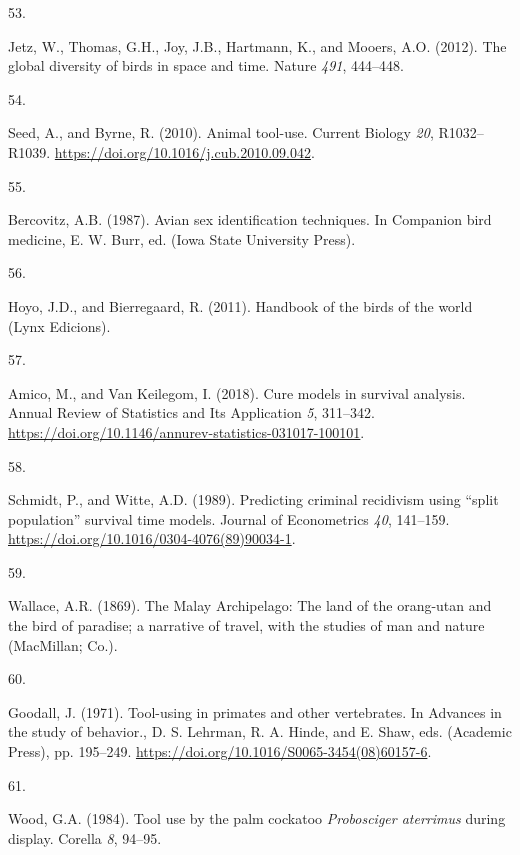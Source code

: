 \documentclass[
  man, donotrepeattitle,floatsintext]{apa6}
\newlength{\cslhangindent}
\newlength{\csllabelwidth}
\newlength{\cslentryspacingunit} %
\newenvironment{CSLReferences}[2] %
 {%
  \setlength{\parindent}{0pt}
  \ifodd #1
  \let\oldpar\par
  \def\par{\hangindent=\cslhangindent\oldpar}
  \fi
  \setlength{\parskip}{#2\cslentryspacingunit}
 }%
 {}
\newcommand{\CSLLeftMargin}[1]{\parbox[t]{\csllabelwidth}{#1}}
\newcommand{\CSLRightInline}[1]{\parbox[t]{\linewidth - \csllabelwidth}{#1}\break}
\begin{document}
\begin{CSLReferences}{0}{0}
\leavevmode{}%
\CSLLeftMargin{53. }%
\CSLRightInline{Jetz, W., Thomas, G.H., Joy, J.B., Hartmann, K., and Mooers, A.O. (2012). The global diversity of birds in space and time. Nature \emph{491}, 444--448.}

\leavevmode{}%
\CSLLeftMargin{54. }%
\CSLRightInline{Seed, A., and Byrne, R. (2010). Animal tool-use. Current Biology \emph{20}, R1032--R1039. \url{https://doi.org/10.1016/j.cub.2010.09.042}.}

\leavevmode{}%
\CSLLeftMargin{55. }%
\CSLRightInline{Bercovitz, A.B. (1987). Avian sex identification techniques. In Companion bird medicine, E. W. Burr, ed. (Iowa State University Press).}

\leavevmode{}%
\CSLLeftMargin{56. }%
\CSLRightInline{Hoyo, J.D., and Bierregaard, R. (2011). Handbook of the birds of the world (Lynx Edicions).}

\leavevmode{}%
\CSLLeftMargin{57. }%
\CSLRightInline{Amico, M., and Van Keilegom, I. (2018). Cure models in survival analysis. Annual Review of Statistics and Its Application \emph{5}, 311--342. \url{https://doi.org/10.1146/annurev-statistics-031017-100101}.}

\leavevmode{}%
\CSLLeftMargin{58. }%
\CSLRightInline{Schmidt, P., and Witte, A.D. (1989). Predicting criminal recidivism using {``split population''} survival time models. Journal of Econometrics \emph{40}, 141--159. \url{https://doi.org/10.1016/0304-4076(89)90034-1}.}

\leavevmode{}%
\CSLLeftMargin{59. }%
\CSLRightInline{Wallace, A.R. (1869). The {M}alay {A}rchipelago: The land of the orang-utan and the bird of paradise; a narrative of travel, with the studies of man and nature (MacMillan; Co.).}

\leavevmode{}%
\CSLLeftMargin{60. }%
\CSLRightInline{Goodall, J. (1971). Tool-using in primates and other vertebrates. In Advances in the study of behavior., D. S. Lehrman, R. A. Hinde, and E. Shaw, eds. (Academic Press), pp. 195--249. \url{https://doi.org/10.1016/S0065-3454(08)60157-6}.}

\leavevmode{}%
\CSLLeftMargin{61. }%
\CSLRightInline{Wood, G.A. (1984). Tool use by the palm cockatoo \emph{{P}robosciger aterrimus} during display. Corella \emph{8}, 94--95.}


\end{CSLReferences}
\end{document}
